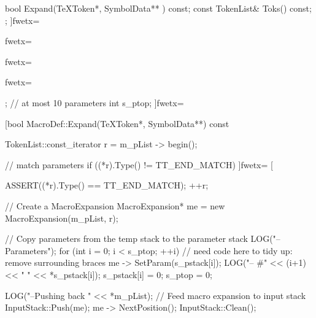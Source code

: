 {{{{{{{{   bool Expand(TeXToken*, SymbolData** ) const;
   const TokenList& Toks() const;
};
]fwetx=%
\fwcdef 
\fwbeginmacronotes
{}
\fwendmacronotes
\fwendmacro


\fwbeginmacro
{}\fwequals \fwodef {}fwetx=%
\fwcdef 
\fwbeginmacronotes
{}
\fwendmacronotes
\fwendmacro


\fwbeginmacro
{}\fwequals \fwodef {}fwetx=%
\fwcdef 
\fwbeginmacronotes
{}
\fwendmacronotes
\fwendmacro



\fwbeginmacro
{}\fwequals \fwodef \fwbtx[const TokenList& MacroDef::Toks() const
{
   ASSERT(m_pList != 0);
   return *m_pList;
}
]fwetx=%
\fwcdef 
\fwbeginmacronotes
{}
\fwendmacronotes
\fwendmacro



\fwbeginmacro
{}\fwequals \fwodef \fwbtx[   TokenList* s_pstack[10]; // at most 10 parameters
   int s_ptop;
]fwetx=%
\fwcdef 
\fwbeginmacronotes
{}
\fwendmacronotes
\fwendmacro


\fwbeginmacro
{}\fwequals \fwodef \fwbtx[bool MacroDef::Expand(TeXToken*, SymbolData**) const
{
   TokenList::const_iterator r = m_pList -> begin();

   // match parameters
   if ((*r).Type() != TT_END_MATCH){
      ]fwetx=%
\fwbtx[
   }

   ASSERT((*r).Type() == TT_END_MATCH);
   ++r;

   // Create a MacroExpansion
   MacroExpansion* me = new MacroExpansion(m_pList, r);

   // Copy parameters from the temp stack to the parameter stack
   LOG("\n--Parameters");
   for (int i = 0; i < s_ptop; ++i){
      // need code here to tidy up: remove surrounding braces
      me -> SetParam(s_pstack[i]);
      LOG("\n--    #" << (i+1) << " " << *s_pstack[i]);
      s_pstack[i] = 0;
   }
   s_ptop = 0;

   LOG("\n--Pushing back " << *m_pList);
   // Feed macro expansion to input stack
   InputStack::Push(me);
   me -> NextPosition();
   InputStack::Clean();

}}}}}}}}
